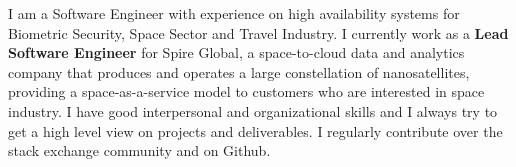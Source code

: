 

\begin{cvparagraph}

I am a Software Engineer with experience on high availability systems for Biometric Security, Space Sector and Travel Industry.
I currently work as a \textbf{Lead Software Engineer} for Spire Global, a space-to-cloud data and analytics company that produces and operates a large constellation of nanosatellites,
providing a space-as-a-service model to customers who are interested in space industry.
I have good interpersonal and organizational skills and I always try to get a high level view on projects and deliverables.
I regularly contribute over the stack exchange community and on Github.
\end{cvparagraph}

